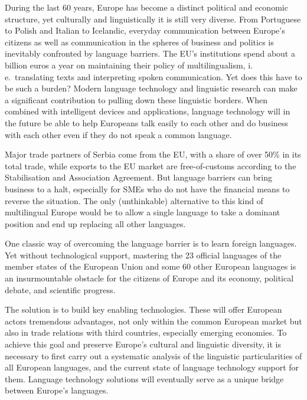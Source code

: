 \begin{multicols}{2}

    
During the last 60 years, Europe has become a distinct political and economic structure, yet culturally and linguistically it is still very diverse. From Portuguese to Polish and Italian to Icelandic, everyday communication between Europe’s citizens as well as communication in the spheres of business and politics is inevitably confronted by language barriers. 
The EU’s institutions spend about a billion euros a year on maintaining their policy of multilingualism, i.\,e.~translating texts and interpreting spoken communication. Yet does this have to be such a burden? Modern language technology and linguistic research can make a significant contribution to pulling down these linguistic borders. When combined with intelligent devices and applications, language technology will in the future be able to help Europeans talk easily to each other and do business with each other even if they do not speak a common language. 


Major trade partners of Serbia come from the EU, with a share of over 50\% in its total trade, while exports to the EU market are free-of-customs according to the Stabilisation and Association Agreement. But language barriers can bring business to a halt, especially for SMEs who do not have the financial means to reverse the situation. The only (unthinkable) alternative to this kind of multilingual Europe would be to allow a single language to take a dominant position and end up replacing all other languages. 

One classic way of overcoming the language barrier is to learn foreign languages. Yet without technological support, mastering the 23 official languages of the member states of the European Union and some 60 other European languages is an insurmountable obstacle for the citizens of Europe and its economy, political debate, and scientific progress.   

The solution is to build key enabling technologies. These will offer European actors tremendous advantages, not only within the common European market but also in trade relations with third countries, especially emerging economies.  To achieve this goal and preserve Europe’s cultural and linguistic diversity, it is necessary to first carry out a systematic analysis of the linguistic particularities of all European languages, and the current state of language technology support for them. Language technology solutions will eventually serve as a unique bridge between Europe’s languages. 


\end{multicols}
